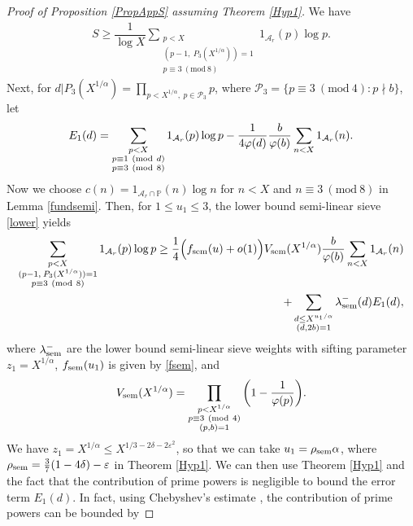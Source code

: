 \documentclass[12pt]{amsart}
\numberwithin{equation}{section}
\theoremstyle{remark}
\theoremstyle{definition}
\newcommand{\imod}[1]{\ (\mathrm{mod}\ #1)}
\begin{document}
\begin{proof}[Proof of Proposition \ref{PropAppS} assuming Theorem \ref{Hyp1}]
We have
\begin{align}
\label{semi0} S\geq \dfrac{1}{\log X}\sum_{\substack{p<X\\(p-1,\: P_3(X^{1/\alpha}))=1\\p\equiv 3\imod 8}}1_{\mathcal{A}_r}(p)\log p.
\end{align}
Next, for $d|P_3(X^{1/\alpha})=\prod_{p<X^{1/\alpha},\: p\in \mathcal{P}_3}p$, where $\mathcal{P}_3=\{p\equiv 3\imod 4: p\nmid b\}$, let
\begin{align}
\notag {E}_1(d)=\sum_{\substack{p<X\\p\equiv 1\imod {d}\\p\equiv 3\imod 8}}1_{\mathcal{A}_r}(p)\log p-\dfrac{1}{4\varphi(d)}\dfrac{b}{\varphi(b)}\sum_{n<X}1_{\mathcal{A}_r}(n).
\end{align}
Now we choose $c(n)=1_{\mathcal{A}_r\cap \mathbb{P}}(n)\log n$ for $n<X$ and $n\equiv 3\imod 8$ in Lemma \ref{fundsemi}. Then, for $1\leq u_1\leq 3$, the lower bound semi-linear sieve \eqref{lower} yields
\begin{align}
\notag \sum_{\substack{p<X\\(p-1,\: P_3(X^{1/\alpha}))=1\\p\equiv 3\imod 8}}1_{\mathcal{A}_r}(p)\log p \geq \dfrac{1}{4}\Big(f_{\textup{sem}}(u)+o(1)\Big)V_{\textup{sem}}(X^{1/\alpha})\dfrac{b}{\varphi(b)}\sum_{n<X}1_{\mathcal{A}_r}(n)\\
\label{semi1} + \sum_{\substack{d\leq X^{u_1/\alpha}\\(d, 2b)=1}}\lambda^-_{\textup{sem}}(d){E}_1(d),
\end{align}
where $\lambda^-_{\textup{sem}}$ are the lower bound semi-linear sieve weights with sifting parameter $z_1=X^{1/\alpha}$, $f_{\textup{sem}}(u_1)$ is given by \eqref{fsem}, and 
\begin{align}
 V_{\textup{sem}}(X^{1/\alpha})=\prod_{\substack{p<X^{1/\alpha}\\p\equiv 3\imod 4\\(p,b)=1}}\bigg(1-\dfrac{1}{\varphi(p)}\bigg).
\end{align}
We have $z_1=X^{1/\alpha}\leq X^{1/3-2\delta-2\varepsilon^2}$, so that we can take $u_1=\rho_{\textup{sem}} \alpha$, where $\rho_{\textup{sem}}=\frac{3}{7}(1-4\delta)-\varepsilon$ in Theorem \ref{Hyp1}. We can then use Theorem \ref{Hyp1} and the fact that the contribution of prime powers is negligible to bound the error term $E_1(d)$. In fact, using Chebyshev's estimate \cite[Theorem 2.4]{kou}, the contribution of prime powers can be bounded by 

\end{proof}
\end{document}

